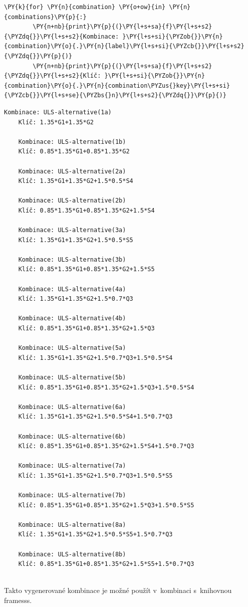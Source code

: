         \begin{tcolorbox}[breakable, size=fbox, boxrule=1pt, pad at break*=1mm,colback=cellbackground, colframe=cellborder]
    \begin{Verbatim}[commandchars=\\\{\}]
    \PY{k}{for} \PY{n}{combination} \PY{o+ow}{in} \PY{n}{combinations}\PY{p}{:}
        \PY{n+nb}{print}\PY{p}{(}\PY{l+s+sa}{f}\PY{l+s+s2}{\PYZdq{}}\PY{l+s+s2}{Kombinace: }\PY{l+s+si}{\PYZob{}}\PY{n}{combination}\PY{o}{.}\PY{n}{label}\PY{l+s+si}{\PYZcb{}}\PY{l+s+s2}{\PYZdq{}}\PY{p}{)}
        \PY{n+nb}{print}\PY{p}{(}\PY{l+s+sa}{f}\PY{l+s+s2}{\PYZdq{}}\PY{l+s+s2}{Klíč: }\PY{l+s+si}{\PYZob{}}\PY{n}{combination}\PY{o}{.}\PY{n}{combination\PYZus{}key}\PY{l+s+si}{\PYZcb{}}\PY{l+s+se}{\PYZbs{}n}\PY{l+s+s2}{\PYZdq{}}\PY{p}{)}
    \end{Verbatim}
    \end{tcolorbox}
    
        \begin{Verbatim}[commandchars=\\\{\}]
    Kombinace: ULS-alternative(1a)
    Klíč: 1.35*G1+1.35*G2
    
    Kombinace: ULS-alternative(1b)
    Klíč: 0.85*1.35*G1+0.85*1.35*G2
    
    Kombinace: ULS-alternative(2a)
    Klíč: 1.35*G1+1.35*G2+1.5*0.5*S4
    
    Kombinace: ULS-alternative(2b)
    Klíč: 0.85*1.35*G1+0.85*1.35*G2+1.5*S4
    
    Kombinace: ULS-alternative(3a)
    Klíč: 1.35*G1+1.35*G2+1.5*0.5*S5
    
    Kombinace: ULS-alternative(3b)
    Klíč: 0.85*1.35*G1+0.85*1.35*G2+1.5*S5
    
    Kombinace: ULS-alternative(4a)
    Klíč: 1.35*G1+1.35*G2+1.5*0.7*Q3
    
    Kombinace: ULS-alternative(4b)
    Klíč: 0.85*1.35*G1+0.85*1.35*G2+1.5*Q3
    
    Kombinace: ULS-alternative(5a)
    Klíč: 1.35*G1+1.35*G2+1.5*0.7*Q3+1.5*0.5*S4
    
    Kombinace: ULS-alternative(5b)
    Klíč: 0.85*1.35*G1+0.85*1.35*G2+1.5*Q3+1.5*0.5*S4
    
    Kombinace: ULS-alternative(6a)
    Klíč: 1.35*G1+1.35*G2+1.5*0.5*S4+1.5*0.7*Q3
    
    Kombinace: ULS-alternative(6b)
    Klíč: 0.85*1.35*G1+0.85*1.35*G2+1.5*S4+1.5*0.7*Q3
    
    Kombinace: ULS-alternative(7a)
    Klíč: 1.35*G1+1.35*G2+1.5*0.7*Q3+1.5*0.5*S5
    
    Kombinace: ULS-alternative(7b)
    Klíč: 0.85*1.35*G1+0.85*1.35*G2+1.5*Q3+1.5*0.5*S5
    
    Kombinace: ULS-alternative(8a)
    Klíč: 1.35*G1+1.35*G2+1.5*0.5*S5+1.5*0.7*Q3
    
    Kombinace: ULS-alternative(8b)
    Klíč: 0.85*1.35*G1+0.85*1.35*G2+1.5*S5+1.5*0.7*Q3
    
        \end{Verbatim}

Takto vygenerované kombinace je možné použít v~kombinaci s~knihovnou framesss.